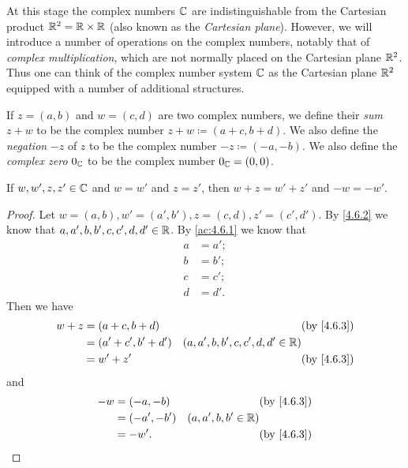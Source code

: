 \begin{note}
  At this stage the complex numbers \(\mathbb{C}\) are indistinguishable from the Cartesian product \(\mathbb{R}^2 = \mathbb{R} \times \mathbb{R}\)
  (also known as the \emph{Cartesian plane}).
  However, we will introduce a number of operations on the complex numbers, notably that of \emph{complex multiplication}, which are not normally placed on the Cartesian plane \(\mathbb{R}^2\).
  Thus one can think of the complex number system \(\mathbb{C}\) as the Cartesian plane \(\mathbb{R}^2\) equipped with a number of additional structures.
\end{note}

\begin{defn}\label{4.6.3}
  If \(z = (a, b)\) and \(w = (c, d)\) are two complex numbers, we define their \emph{sum} \(z + w\) to be the complex number \(z + w \coloneqq (a + c, b + d)\).
  We also define the \emph{negation} \(-z\) of \(z\) to be the complex number \(-z \coloneqq (-a, -b)\).
  We also define the \emph{complex zero} \(0_{\mathbb{C}}\) to be the complex number \(0_{\mathbb{C}} = (0, 0)\).
\end{defn}

\begin{ac}\label{ac:4.6.2}
  If \(w, w', z, z' \in \mathbb{C}\) and \(w = w'\) and \(z = z'\), then \(w + z = w' + z'\) and \(-w = -w'\).
\end{ac}

\begin{proof}
  Let \(w = (a, b), w' = (a', b'), z = (c, d), z' = (c', d')\).
  By \cref{4.6.2} we know that \(a, a', b, b', c, c', d, d' \in \mathbb{R}\).
  By \cref{ac:4.6.1} we know that
  \begin{align*}
    a & = a'; \\
    b & = b'; \\
    c & = c'; \\
    d & = d'.
  \end{align*}
  Then we have
  \begin{align*}
    w + z & = (a + c, b + d)     &                                     & \by{4.6.3} \\
          & = (a' + c', b' + d') & (a, a', b, b', c, c', d, d' \in \R)              \\
          & = w' + z'            &                                     & \by{4.6.3}
  \end{align*}
  and
  \begin{align*}
    -w & = (-a, -b)   &                       & \by{4.6.3} \\
       & = (-a', -b') & (a, a', b, b' \in \R)              \\
       & = -w'.       &                       & \by{4.6.3}
  \end{align*}
\end{proof}

